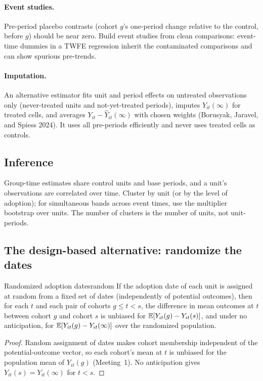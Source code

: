 \documentclass[11pt]{article}
\begin{document}
\paragraph{Event studies.} Pre-period placebo contrasts (cohort $g$'s one-period change relative to the control, before $g$) should be near zero. Build event
studies from clean comparisons: event-time dummies in a TWFE regression inherit the contaminated comparisons and can show spurious pre-trends.

\paragraph{Imputation.} An alternative estimator fits unit and period effects on untreated observations only (never-treated units and not-yet-treated periods),
imputes $Y_{it}(\infty)$ for treated cells, and averages $Y_{it} - \hat Y_{it}(\infty)$ with chosen weights (Borusyak, Jaravel, and Spiess 2024). It uses all
pre-periods efficiently and never uses treated cells as controls.

\subsection{Inference}

Group-time estimates share control units and base periods, and a unit's observations are correlated over time. Cluster by unit (or by the level of adoption);
for simultaneous bands across event times, use the multiplier bootstrap over units. The number of clusters is the number of units, not unit-periods.

\subsection{The design-based alternative: randomize the dates}

\begin{prop}{Randomized adoption dates}{random}
If the adoption date of each unit is assigned at random from a fixed set of dates (independently of potential outcomes), then for each $t$ and each pair of
cohorts $g \le t < s$, the difference in mean outcomes at $t$ between cohort $g$ and cohort $s$ is unbiased for $\mathbb{E}[Y_{it}(g) - Y_{it}(s)]$, and under no
anticipation, for $\mathbb{E}[Y_{it}(g) - Y_{it}(\infty)]$ over the randomized population.
\end{prop}
\begin{proof}
Random assignment of dates makes cohort membership independent of the potential-outcome vector, so each cohort's mean at $t$ is unbiased for the
population mean of $Y_{it}(g)$ (Meeting~1). No anticipation gives $Y_{it}(s) = Y_{it}(\infty)$ for $t < s$.
\end{proof}
\end{document}
